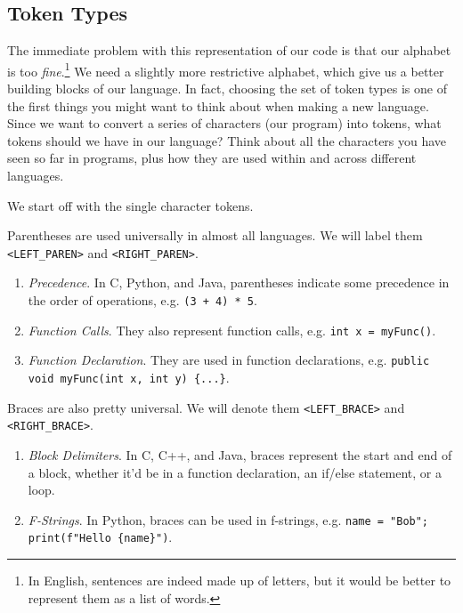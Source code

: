 \subsection{Token Types}

  The immediate problem with this representation of our code is that our alphabet is too \textit{fine}.\footnote{In English, sentences are indeed made up of letters, but it would be better to represent them as a list of words.} We need a slightly more restrictive alphabet, which give us a better building blocks of our language. In fact, choosing the set of token types is one of the first things you might want to think about when making a new language. Since we want to convert a series of characters (our program) into tokens, what tokens should we have in our language? Think about all the characters you have seen so far in programs, plus how they are used within and across different languages. 

  We start off with the single character tokens. 

  \begin{example}[Parentheses]
    \label{ex:parentheses}
    Parentheses are used universally in almost all languages. We will label them \texttt{<LEFT\_PAREN>} and \texttt{<RIGHT\_PAREN>}.
    \begin{enumerate}
      \item \textit{Precedence}. In C, Python, and Java, parentheses indicate some precedence in the order of operations, e.g. \texttt{(3 + 4) * 5}.
      \item \textit{Function Calls}. They also represent function calls, e.g. \texttt{int x = myFunc()}. 
      \item \textit{Function Declaration}. They are used in function declarations, e.g. \texttt{public void myFunc(int x, int y) \{...\}}. 
    \end{enumerate}
  \end{example}

  \begin{example}[Braces]
    \label{ex:braces}
    Braces are also pretty universal. We will denote them \texttt{<LEFT\_BRACE>} and \texttt{<RIGHT\_BRACE>}.
    \begin{enumerate}
      \item \textit{Block Delimiters}. In C, C++, and Java, braces represent the start and end of a block, whether it'd be in a function declaration, an if/else statement, or a loop. 
      \item \textit{F-Strings}. In Python, braces can be used in f-strings, e.g. \texttt{name = "Bob"; print(f"Hello \{name\}")}.
    \end{enumerate}
  \end{example} 

